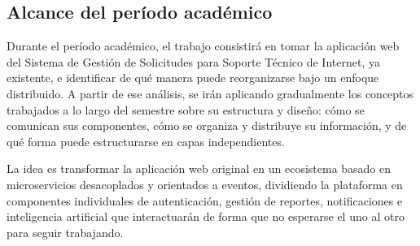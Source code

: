 \documentclass[12pt, a4paper]{article}
\begin{document}
\newpage

\subsection{Alcance del período académico}

Durante el período académico, el trabajo consistirá en tomar la aplicación web del Sistema de Gestión de Solicitudes para Soporte Técnico de Internet, ya existente, e identificar de qué manera puede reorganizarse bajo un enfoque distribuido. A partir de ese análisis, se irán aplicando gradualmente los conceptos trabajados a lo largo del semestre sobre su estructura y diseño: cómo se comunican sus componentes, cómo se organiza y distribuye su información, y de qué forma puede estructurarse en capas independientes.

La idea es transformar la aplicación web original en un ecosistema basado en microservicios desacoplados y orientados a eventos, dividiendo la plataforma en componentes individuales de autenticación, gestión de reportes, notificaciones e inteligencia artificial que interactuarán de forma que no esperarse el uno al otro para seguir trabajando.
\end{document}

